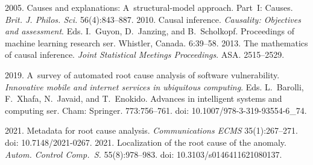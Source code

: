 





  \begin{multicols}{2}

\renewcommand{\bibname}{\protect\rmfamily References}

{\small\frenchspacing
 {%
 \begin{thebibliography}{99} 
 2005. Causes and explanations: A~structural-model approach. 
Part~I: Causes. \textit{Brit. J. Philos. Sci.} 56(4):843--887.
 2010. Causal inference. \textit{Causality: Objectives and 
assessment}. Eds. I.~Guyon, D.~Janzing, and B.~Scholkopf. Proceedings of machine learning 
research ser. Whistler, Canada. 6:39--58.
 2013. The mathematics of causal inference. \textit{Joint Statistical Meetings 
Proceedings}. ASA. 2515--2529.

 2019. A~survey of automated root cause analysis of software 
vulnerability. \textit{Innovative mobile and internet services in ubiquitous computing}. Eds. 
L.~Barolli, F.~Xhafa, N.~Javaid, and T.~Enokido. Advances in intelligent systems and computing ser. 
Cham: Springer. 773:756--761. doi: 10.1007/978-3-319-93554-6\_74.

 2021. Metadata for 
root cause analysis. \textit{Communications ECMS} 35(1):267--271. doi: 10.7148/2021-0267.
 2021. Localization of 
the root cause of the anomaly. \textit{Autom. Control Comp.~S.} 55(8):978--983. doi: 
10.3103/s0146411621080137.


\end{thebibliography}}}
\end{multicols}
